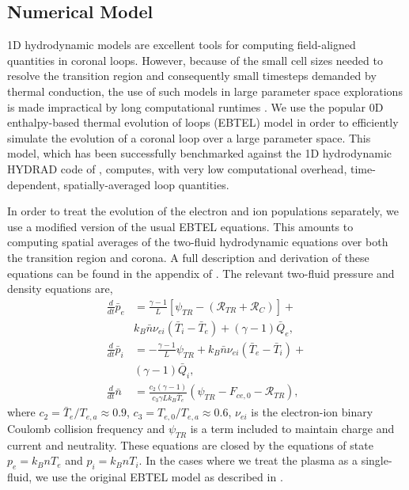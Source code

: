 \documentclass[apj]{emulateapj}
\begin{document}
	\subsection{Numerical Model}
	\label{subsec:numerics}
	\par 1D hydrodynamic models are excellent tools for computing field-aligned quantities in coronal loops. However, because of the small cell sizes needed to resolve the transition region and consequently small timesteps demanded by thermal conduction, the use of such models in large parameter space explorations is made impractical by long computational runtimes \citep{bradshaw_influence_2013}. We use the popular 0D enthalpy-based thermal evolution of loops (EBTEL) model \citep{klimchuk_highly_2008,cargill_enthalpy-based_2012,cargill_enthalpy-based_2012-1,cargill_modelling_2015} in order to efficiently simulate the evolution of a coronal loop over a large parameter space. This model, which has been successfully benchmarked against the 1D hydrodynamic HYDRAD code of \citet{bradshaw_influence_2013}, computes, with very low computational overhead, time-dependent, spatially-averaged loop quantities.
	\par In order to treat the evolution of the electron and ion populations separately, we use a modified version of the usual EBTEL equations. This amounts to computing spatial averages of the two-fluid hydrodynamic equations over both the transition region and corona. A full description and derivation of these equations can be found in the appendix of . The relevant two-fluid pressure and density equations are,
	\begin{align}
		\frac{d}{dt}\bar{p}_e &= \frac{\gamma - 1}{L}\left\lbrack\psi_{TR} - (\mathcal{R}_{TR} + \mathcal{R}_C)\right\rbrack + \\ &k_B\bar{n}\nu_{ei}(\bar{T}_i - \bar{T}_e) + (\gamma - 1)\bar{Q}_e,\label{eq:ebtel2fl_pe}\\
		\frac{d}{dt}\bar{p}_i &= -\frac{\gamma - 1}{L}\psi_{TR} + k_B\bar{n}\nu_{ei}(\bar{T}_e - \bar{T}_i) +\\ &(\gamma - 1)\bar{Q}_i,\label{eq:ebtel2fl_pi}\\
		\frac{d}{dt}\bar{n} &= \frac{c_2(\gamma - 1)}{c_3\gamma Lk_B\bar{T}_e}\left(\psi_{TR} - F_{ce,0} - \mathcal{R}_{TR}\right),\label{eq:ebtel2fl_n}
	\end{align}
	where $c_2=\bar{T}_e/T_{e,a}\approx0.9$, $c_3=T_{e,0}/T_{e,a}\approx0.6$, $\nu_{ei}$ is the electron-ion binary Coulomb collision frequency and $\psi_{TR}$ is a term included to maintain charge and current and neutrality. These equations are closed by the equations of state $p_e=k_BnT_e$ and $p_i=k_BnT_i$. In the cases where we treat the plasma as a single-fluid, we use the original EBTEL model as described in \citet{klimchuk_highly_2008,cargill_enthalpy-based_2012}.
\end{document}
